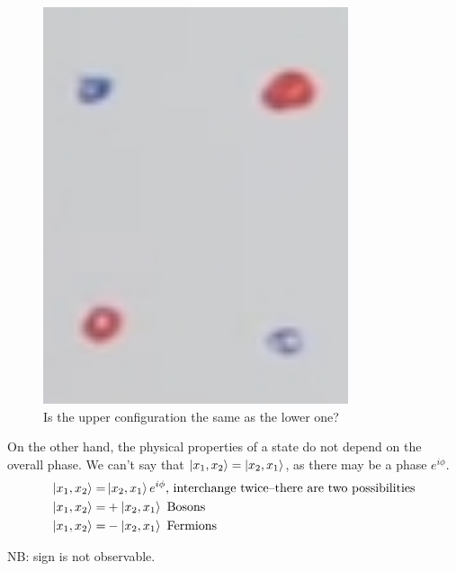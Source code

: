 \documentclass[]{article}
\begin{document}
\begin{figure}[H]
	\begin{center}
		\caption{Is the upper configuration the same as the lower one?}\label{fig:aqm-4-states}
		\includegraphics[width=0.8\textwidth]{aqm-4-states}
	\end{center}
\end{figure}

On the other hand, the physical properties of a state do not depend on the overall phase. We can't say that $\ket{x_1, x_2}=\ket{x_2, x_1}$, as there may be a phase $e^{i\phi}$.
\begin{align*}
	\ket{x_1, x_2}=&\ket{x_2, x_1}e^{i\phi}\text{, interchange twice--there are two possibilities}\\
	\ket{x_1, x_2}=&+\ket{x_2, x_1}\text{ Bosons}\\
	\ket{x_1, x_2}=&-\ket{x_2, x_1}\text{ Fermions}
\end{align*}

NB: sign is not observable.
\end{document}
